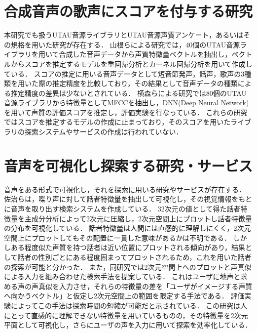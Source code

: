 \section{合成音声の歌声にスコアを付与する研究}
本研究でも扱うUTAU音源ライブラリとUTAU音源声質アンケート，あるいはその規格を用いた研究が存在する．
山根らによる研究\cite{ong}では，40個のUTAU音源ライブラリを用いて合成した音声データから声質特徴量ベクトルを抽出し，ベクトルからスコアを推定するモデルを重回帰分析とカーネル回帰分析を用いて作成している．
スコアの推定に用いる音声データとして短音節発声，話声，歌声の3種類を用いた際の推定精度を比較しており，その結果として音声データの種類による推定精度の差異は少ないとされている．
横森らによる研究\cite{dnn}では80個のUTAU音源ライブラリから特徴量としてMFCCを抽出し，DNN(Deep Neural Network)を用いて声質の評価スコアを推定し，評価実験を行なっている．
これらの研究ではスコアを推定するモデルの作成に止まっており，そのスコアを用いたライブラリの探索システムやサービスの作成は行われていない．

\section{音声を可視化し探索する研究・サービス}
音声をある形式で可視化し，それを探索に用いる研究やサービスが存在する．
佐治らは，喋り声に対して話者特徴量を抽出して可視化し，その視覚情報をもとに音声を取り出す検索システムを作成している\cite{talk_search}．
32次元の値として得た話者特徴量を主成分分析によって2次元に圧縮し，2次元空間上にプロットし話者特徴量の分布を可視化している．
話者特徴量は人間には直感的に理解しにくく，2次元空間上にプロットしてもその配置に一貫した意味があるかは不明である．
しかしある程度似た声質を持つ話者は近い位置にプロットされる傾向があり，結果として話者の性別ごとにある程度固まってプロットされるため，これを用いた話者の探索が可能と分かった．
また，同研究では2次元空間上へのプロットと声真似による入力を組み合わせた検索手法を提案している．
これはユーザに地声と求める声の声真似を入力させ，それらの特徴量の差を「ユーザがイメージする声質へ向かうベクトル」と仮定し2次元空間上の範囲を限定する手法である．
評価実験によってこの手法は探索時間の短縮が可能だと示されている．
この研究は人にとって直感的に理解できない特徴量を用いているものの，その特徴量を2次元平面として可視化し，さらにユーザの声を入力に用いて探索を効率化している．


